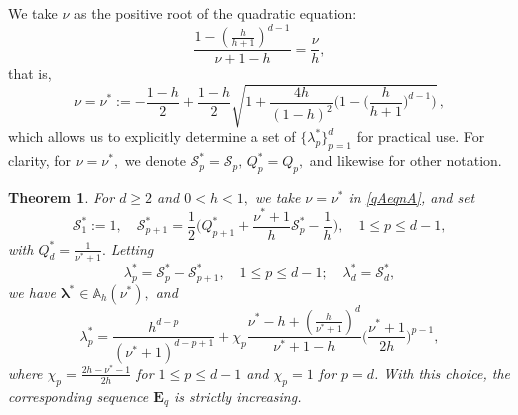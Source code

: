 \documentclass[10pt,reqno,final]{amsart}
\newtheorem{thm}{\bf Theorem}[section]
\newenvironment{theorem}{\begin{thm}} {\end{thm}}
\theoremstyle{remark}
\theoremstyle{definition}
\newcommand{\bs}[1]{\boldsymbol{#1}}
\begin{document}
We take $\nu$ as the positive root of the quadratic  equation: 
\begin{equation}\label{mueqn} 
    \frac{1-(\frac{h}{h+1})^{d-1}}{\nu+1-h}=\frac{\nu}{h}, 
\end{equation}
that is,  
\begin{equation}\label{qAeqnA} 
 \nu=\nu^*:=-\frac{1-h}{2}+ \frac{1-h}{2}\sqrt{1+ \frac 
    {4h}{(1-h)^2}\Big(1 - \Big(\frac{h}{h+1}\Big)^{d-1}\Big)}\,,
\end{equation}
which allows us to explicitly determine a set of  
$\{\lambda_p^*\}_{p=1}^d$ for practical use.   For clarity, for $\nu=\nu^*,$
we denote ${\mathcal S}_p^*={\mathcal S}_p,\, Q_p^*=Q_p,$  and likewise for other notation.   


\begin{theorem}\label{Hypercube-Sep} For $d\ge 2$ and   $0<h<1,$ we take $\nu=\nu^*$ in \eqref{qAeqnA}, and set 
\begin{equation}\label{Spcurrent}
{\mathcal S}_1^*:=1,\quad {\mathcal S}_{p+1}^*=\frac{1}{2}\Big(Q^*_{p+1}+\frac{\nu^*+1}{h}{\mathcal S}_p^*-\frac{1}{h}\Big),\quad 1\le p\le d-1,
\end{equation}
with $Q_d^*=\tfrac 1 {\nu^*+1}.$ Letting 
\begin{equation}\label{lmdpS}
    \lambda_p^*={\mathcal S}_p^*-{\mathcal S}_{p+1}^*,\quad 1\le p\le d-1;\quad \lambda_d^*={\mathcal S}_d^*,
\end{equation}
we have $\bs \lambda^*\in {\mathbb A}_h(\nu^*),$ and 
\begin{equation}\label{def_d_lambda}
    \lambda_p^*=
        \frac{h^{d-p}}{(\nu^*+1)^{d-p+1}}+\chi_p\frac{\nu^*-h+(\frac{h}{\nu^*+1})^d}{\nu^*+1-h}\Big(\frac{\nu^*+1}{2h}\Big)^{p-1},
\end{equation}
where $\chi_p=\tfrac{2h-\nu^*-1}{2h}$ for $1\le p\le d-1$ and $\chi_p=1$ for $p=d$.
With this choice, the corresponding sequence $\bs E_q$ is strictly increasing. 
\end{theorem}
\end{document}
